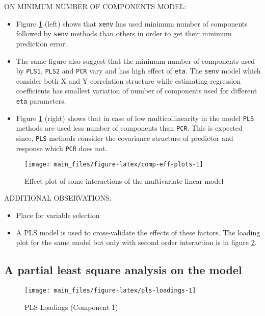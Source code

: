 \documentclass[12pt,3p,authoryear]{elsarticle}
\providecommand{\tightlist}{%
  \setlength{\itemsep}{0pt}\setlength{\parskip}{0pt}}
\begin{document}
ON MINIMUM NUMBER OF COMPONENTS MODEL:

\begin{itemize}
\tightlist
\item
  Figure \ref{fig:comp-eff-plots} (left) shows that \texttt{xenv} has
  used minimum number of components followed by \texttt{senv} methods
  than others in order to get their minimum prediction error.
\item
  The same figure also suggest that the minimum number of components
  used by \texttt{PLS1}, \texttt{PLS2} and \texttt{PCR} vary and has
  high effect of \texttt{eta}. The \texttt{senv} model which consider
  both X and Y correlation structure while estimating regression
  coefficients has smallest variation of number of components used for
  different \texttt{eta} parameters.
\item
  Figure \ref{fig:comp-eff-plots} (right) shows that in case of low
  multicollinearity in the model \texttt{PLS} methods are used less
  number of components than \texttt{PCR}. This is expected since,
  \texttt{PLS} methods consider the covariance structure of predictor
  and response which \texttt{PCR} does not.
\end{itemize}

\begin{figure}
\texttt{[image: main\_files/figure-latex/comp-eff-plots-1]} \caption{Effect plot of some interactions of the multivariate linear model}\label{fig:comp-eff-plots}
\end{figure}

ADDITIONAL OBSERVATIONS:

\begin{itemize}
\tightlist
\item
  Place for variable selection
\item
  A PLS model is used to cross-validate the effects of these factors.
  The loading plot for the same model but only with second order
  interaction is in figure \ref{fig:pls-loadings}.
\end{itemize}

\hypertarget{a-partial-least-square-analysis-on-the-model}{%
\subsection{A partial least square analysis on the
model}\label{a-partial-least-square-analysis-on-the-model}}

\begin{figure}
\texttt{[image: main\_files/figure-latex/pls-loadings-1]} \caption{PLS Loadings (Component 1)}\label{fig:pls-loadings}
\end{figure}
\end{document}
